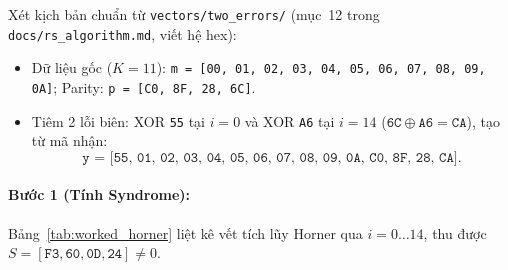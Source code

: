 Xét kịch bản chuẩn từ \texttt{vectors/two\_errors/} (mục~12 trong \texttt{docs/rs\_algorithm.md}, viết hệ hex):
\begin{itemize}
    \item Dữ liệu gốc ($K=11$): \texttt{m = [00, 01, 02, 03, 04, 05, 06, 07, 08, 09, 0A]}; Parity: \texttt{p = [C0, 8F, 28, 6C]}.
    \item Tiêm 2 lỗi biên: XOR \texttt{55} tại $i=0$ và XOR \texttt{A6} tại $i=14$ ($\texttt{6C}\oplus\texttt{A6}=\texttt{CA}$), tạo từ mã nhận:
    \[
    \texttt{y = [55, 01, 02, 03, 04, 05, 06, 07, 08, 09, 0A, C0, 8F, 28, CA]}.
    \]
\end{itemize}

\paragraph{Bước 1 (Tính Syndrome):} Bảng~\ref{tab:worked_horner} liệt kê vết tích lũy Horner qua $i = 0 \dots 14$, thu được $S = [\texttt{F3}, \texttt{60}, \texttt{0D}, \texttt{24}] \neq 0$.

